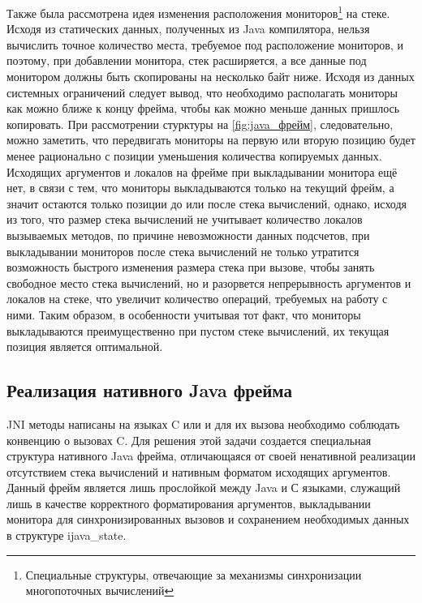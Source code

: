 Также была рассмотрена идея изменения расположения мониторов\footnote{Специальные структуры, отвечающие за механизмы синхронизации многопоточных вычислений} на стеке. Исходя из статических данных, полученных из Java компилятора, нельзя вычислить точное количество места, требуемое под расположение мониторов, и поэтому, при добавлении монитора, стек расширяется, а все данные под монитором должны быть скопированы на несколько байт ниже. Исходя из данных системных ограничений следует вывод, что необходимо располагать мониторы как можно ближе к концу фрейма, чтобы как можно меньше данных пришлось копировать. При рассмотрении стурктуры на \ref{fig:java_фрейм}, следовательно, можно заметить, что передвигать мониторы на первую или вторую позицию будет менее рационально с позиции уменьшения количества копируемых данных. Исходящих аргументов и локалов на фрейме при выкладывании монитора ещё нет, в связи с тем, что мониторы выкладываются только на текущий фрейм, а значит остаются только позиции до или после стека вычислений, однако, исходя из того, что размер стека вычислений не учитывает количество локалов вызываемых методов, по причине невозможности данных подсчетов, при выкладывании мониторов после стека вычислений не только утратится возможность быстрого изменения размера стека при вызове, чтобы занять свободное место стека вычислений, но и разорвется непрерывность аргументов и локалов на стеке, что увеличит количество операций, требуемых на работу с ними. Таким образом, в особенности учитывая тот факт, что мониторы выкладываются преимущественно при пустом стеке вычислений, их текущая позиция является оптимальной.



\subsection{Реализация нативного Java фрейма}
JNI методы написаны на языках C или \cpp и для их вызова необходимо соблюдать конвенцию о вызовах C. Для решения этой задачи создается специальная структура нативного Java фрейма, отличающаяся от своей ненативной реализации отсутствием стека вычислений и нативным форматом исходящих аргументов. Данный фрейм является лишь прослойкой между Java и С языками, служащий лишь в качестве корректного форматирования аргументов, выкладывании монитора для синхронизированных вызовов и сохранением необходимых данных в структуре ijava\_state.




